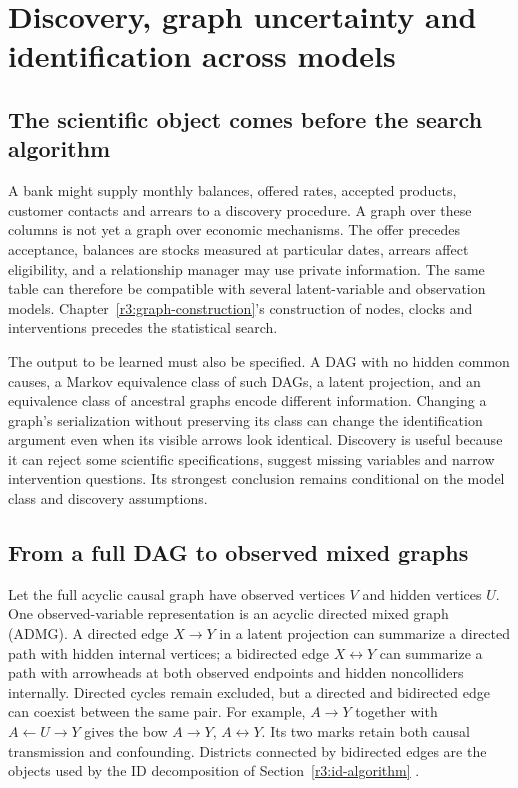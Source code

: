 \chapter{Discovery, graph uncertainty and identification across models}
\label{r3:discovery}
\section{The scientific object comes before the search algorithm}
A bank might supply monthly balances, offered rates, accepted products,
customer contacts and arrears to a discovery procedure. A graph over these
columns is not yet a graph over economic mechanisms. The offer precedes
acceptance, balances are stocks measured at particular dates, arrears affect
eligibility, and a relationship manager may use private information. The
same table can therefore be compatible with several latent-variable and
observation models. Chapter~\ref{r3:graph-construction}'s construction of
nodes, clocks and interventions precedes the statistical search.

The output to be learned must also be specified. A DAG with no hidden
common causes, a Markov equivalence class of such DAGs, a latent projection,
and an equivalence class of ancestral graphs encode different information.
Changing a graph's serialization without preserving its class can change
the identification argument even when its visible arrows look identical.
Discovery is useful because it can reject some scientific specifications,
suggest missing variables and narrow intervention questions. Its strongest
conclusion remains conditional on the model class and discovery assumptions.

\section{From a full DAG to observed mixed graphs}
\label{r3:latent-graphs}
Let the full acyclic causal graph have observed vertices $V$ and hidden
vertices $U$. One observed-variable representation is an acyclic directed
mixed graph (ADMG). A directed edge $X\to Y$ in a latent projection can
summarize a directed path with hidden internal vertices; a bidirected edge
$X\leftrightarrow Y$ can summarize a path with arrowheads at both
observed endpoints and hidden noncolliders internally. Directed cycles
remain excluded, but a directed and bidirected edge can coexist between
the same pair. For example, $A\to Y$ together with $A\leftarrow U\to Y$
gives the bow $A\to Y$, $A\leftrightarrow Y$. Its two marks retain both
causal transmission and confounding. Districts connected by bidirected
edges are the objects used by the ID decomposition of
Section~\ref{r3:id-algorithm} \citep{id2006}.

